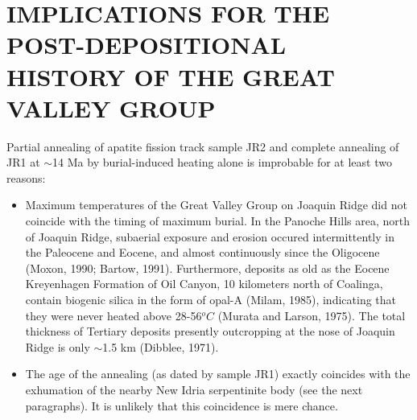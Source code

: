 \documentclass[11pt,twoside]{article}
\begin{document}
\section*{\uppercase{Implications for the post-depositional history of the Great Valley Group}}

Partial  annealing of apatite  fission track  sample JR2  and complete
annealing of  JR1 at  $\sim$14 Ma by  burial-induced heating  alone is
improbable for at least two reasons:

\begin{itemize}
\item Maximum temperatures of the  Great Valley Group on Joaquin Ridge
did not  coincide with the timing  of maximum burial.   In the Panoche
Hills  area, north of  Joaquin Ridge,  subaerial exposure  and erosion
occured  intermittently  in  the  Paleocene  and  Eocene,  and  almost
continuously  since   the  Oligocene  (Moxon,   1990;  Bartow,  1991).
Furthermore, deposits  as old as  the Eocene Kreyenhagen  Formation of
Oil Canyon,  10 kilometers north of Coalinga,  contain biogenic silica
in the form  of opal-A (Milam, 1985), indicating  that they were never
heated  above  28-56$^oC$  (Murata   and  Larson,  1975).   The  total
thickness of  Tertiary deposits presently  outcropping at the  nose of
Joaquin Ridge is only $\sim$1.5 km (Dibblee, 1971).
\item  The age  of  the annealing  (as  dated by  sample JR1)  exactly
coincides  with the exhumation  of the  nearby New  Idria serpentinite
body (see the  next paragraphs). It is unlikely  that this coincidence
is mere chance.
\end{itemize}
\end{document}
